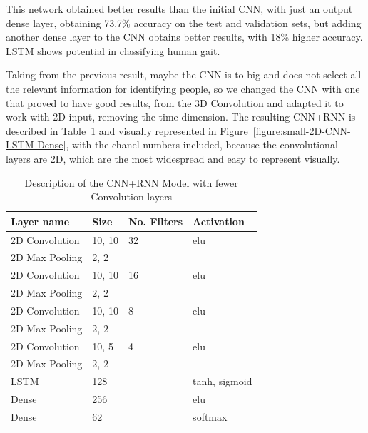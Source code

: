 \documentclass[12pt]{article}
\theoremstyle{definition}
\begin{document}
	This network obtained better results than the initial CNN, with just an output dense layer, obtaining 73.7\% accuracy on the test and validation sets, but adding another dense layer to the CNN obtains better results, with 18\% higher accuracy. LSTM shows potential in classifying human gait.

	Taking from the previous result, maybe the CNN is to big and does not select all the relevant information for identifying people, so we changed the CNN with one that proved to have good results, from the 3D Convolution and adapted it to work with 2D input, removing the time dimension. The resulting CNN+RNN is described in Table~\ref{table:small-CNN-LSTM} and visually represented in Figure~\ref{figure:small-2D-CNN-LSTM-Dense}, with the chanel numbers included, because the convolutional layers are 2D, which are the most widespread and easy to represent visually.

	\begin{table}[h]
		\centering
		\renewcommand{\arraystretch}{1.5}

		\caption{Description of the CNN+RNN Model with fewer Convolution layers}
		\label{table:small-CNN-LSTM}

		\begin{tabularx}{\textwidth}{XXXX}
			\textbf{Layer name} & \textbf{Size} & \textbf{No. Filters} & \textbf{Activation} \\ \hline
			2D Convolution & 10, 10 & 32                   & elu                  \\ \hline
			2D Max Pooling & 2, 2   & \textbf{\textendash} & \textbf{\textendash} \\ \hline
			2D Convolution & 10, 10 & 16                   & elu                  \\ \hline
			2D Max Pooling & 2, 2   & \textbf{\textendash} & \textbf{\textendash} \\ \hline
			2D Convolution & 10, 10 & 8                    & elu                  \\ \hline
			2D Max Pooling & 2, 2   & \textbf{\textendash} & \textbf{\textendash} \\ \hline
			2D Convolution & 10, 5  & 4                    & elu                  \\ \hline
			2D Max Pooling & 2, 2   & \textbf{\textendash} & \textbf{\textendash} \\ \hline
			LSTM           & 128    & \textbf{\textendash} & tanh, sigmoid        \\ \hline
			Dense          & 256    & \textbf{\textendash} & elu                  \\ \hline
			Dense          & 62     & \textbf{\textendash} & softmax              \\
		\end{tabularx}
	\end{table}
\end{document}
